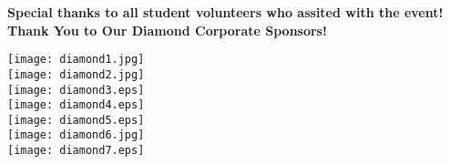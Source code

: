 \documentclass[twoside]{article}
\begin{document}
    { \fontsize{14}{17}\selectfont \bf Special thanks to all student volunteers who assited with the event!}\newpage
    \notepages
    { \fontsize{16}{19}\selectfont \bf Thank You to Our Diamond Corporate Sponsors!}\\
    \begin{center}\vspace{-1.3em}
    \begin{adjustbox}{max size={0.65\textwidth}{!}}\texttt{[image: diamond1.jpg]}\end{adjustbox}\vspace{1em}\\
        \begin{adjustbox}{max size={0.65\textwidth}{!}}\texttt{[image: diamond2.jpg]}\end{adjustbox}\vspace{1em}\\
        \begin{adjustbox}{max size={0.65\textwidth}{!}}\texttt{[image: diamond3.eps]}\end{adjustbox}\vspace{1em}\\
        \begin{adjustbox}{max size={0.65\textwidth}{!}}\texttt{[image: diamond4.eps]}\end{adjustbox}\vspace{1em}\\
        \begin{adjustbox}{max size={0.65\textwidth}{!}}\texttt{[image: diamond5.eps]}\end{adjustbox}\vspace{1em}\\
        \begin{adjustbox}{max size={0.65\textwidth}{!}}\texttt{[image: diamond6.jpg]}\end{adjustbox}\vspace{1em}\\
        \begin{adjustbox}{max size={0.65\textwidth}{!}}\texttt{[image: diamond7.eps]}\end{adjustbox}\vspace{1em}\\
        \end{center}
\end{document}
